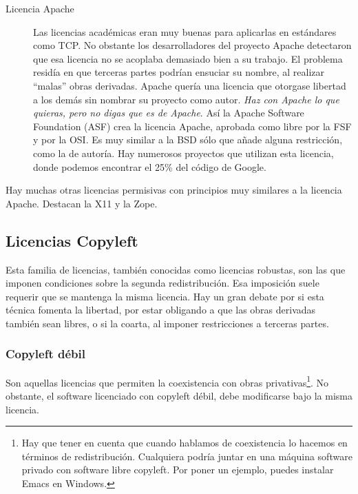 \begin{description}
  \item[Licencia Apache] Las licencias académicas eran muy buenas para
    aplicarlas en estándares como TCP. No obstante los desarrolladores
    del proyecto Apache detectaron que esa licencia no se acoplaba
    demasiado bien a su trabajo. El problema residía en que terceras
    partes podrían ensuciar su nombre, al realizar ``malas'' obras
    derivadas. Apache quería una licencia que otorgase libertad a los
    demás sin nombrar su proyecto como autor. \emph{Haz con Apache lo
      que quieras, pero no digas que es de Apache}. Así la Apache
    Software Foundation (ASF) crea la licencia Apache, aprobada como
    libre por la FSF y por la OSI. Es muy similar a la BSD sólo que
    añade alguna restricción, como la de autoría. Hay numerosos
    proyectos que utilizan esta licencia, donde podemos encontrar el
    25\% del código de Google.
\end{description}

Hay muchas otras licencias permisivas con principios muy similares a
la licencia Apache. Destacan la X11 y la Zope.

\subsection{Licencias Copyleft}

Esta familia de licencias, también conocidas como licencias robustas,
son las que imponen condiciones sobre la segunda redistribución. Esa
imposición suele requerir que se mantenga la misma licencia. Hay un
gran debate por si esta técnica fomenta la libertad, por estar
obligando a que las obras derivadas también sean libres, o si la
coarta, al imponer restricciones a terceras partes.

\subsubsection{Copyleft débil}

Son aquellas licencias que permiten la coexistencia con obras
privativas\footnote{Hay que tener en cuenta que cuando hablamos de
  coexistencia lo hacemos en términos de redistribución. Cualquiera
  podría juntar en una máquina software privado con software libre
  copyleft. Por poner un ejemplo, puedes instalar Emacs en
  Windows.}. No obstante, el software licenciado con copyleft débil,
debe modificarse bajo la misma licencia.

